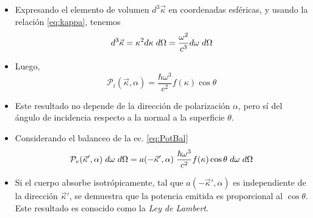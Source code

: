 \documentclass[aspectratio=1610]{beamer}
\newcommand{\kv}{\Vec{\kappa}}
\begin{document}
\begin{frame}
\begin{columns}
\begin{figure}
\begin{tikzpicture}[x=.87pt,y=.87pt,yscale=-1,xscale=1]
				
			\end{tikzpicture}
			
		\end{figure}
	\end{columns}
\end{frame}

\begin{frame}
	\begin{itemize}
		\item Expresando el elemento de volumen $d^3\kv$ en coordenadas esféricas, y usando la relación \ref{eq:kappa}, tenemos
		\begin{equation}
			d^3\kv = \kappa^2 d\kappa\hspace{1mm} d\Omega = \dfrac{\omega^2}{c^3}d\omega\hspace{1mm} d\Omega
			\label{eq:KappaEsf}
		\end{equation}\pause
		\item Luego,
		\begin{equation}
			\mathcal{P}_i(\kv,\alpha) = \dfrac{\hbar\omega^3}{c^2}f(\kappa) \cos{\theta} 
		\end{equation}\pause
		\item Este resultado no depende de la dirección de polarización $\alpha$, pero sí del ángulo de incidencia respecto a la normal a la superficie $\theta$.
	\end{itemize}
\end{frame}

\begin{frame}
	\begin{itemize}
		\item Considerando el balanceo de la ec. \ref{eq:PotBal}
		\begin{equation}
			\mathcal{P}_e(\kv',\alpha)\hspace{1mm}d\omega\hspace{1mm}d\Omega = a(-\kv',\alpha)\hspace{1mm}\dfrac{\hbar\omega^3}{c^2}f(\kappa) \cos{\theta}\hspace{1mm}d\omega\hspace{1mm}d\Omega
			\label{eq:PotExp}
		\end{equation}\pause
		\item Si el cuerpo absorbe isotrópicamente, tal que $a(-\kv',\alpha)$ es independiente de la dirección $\kv'$, se demuestra que la potencia emitida es proporcional al $\cos{\theta}$. Este resultado es conocido como la \emph{Ley de Lambert}.
	\end{itemize}
\end{frame}
\end{document}
